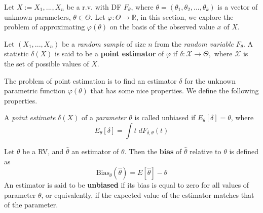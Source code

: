 \documentclass{tufte-handout}
\begin{document}
\hspace{24pt}Let $X := X_1, ...,X_n$ be a r.v. with DF $F_\theta$, where $\theta = (\theta_1, \theta_2 , . . . , \theta_k)$ is a vector of unknown parameters, $\theta \in \Theta$. Let $\varphi: \Theta \to \mathbb{R}$,  in this section, we explore the problem of approximating $\varphi(\theta)$ on the basis of the observed value $x$ of $X.$ 
\begin{definition}
  Let $(X_1,...,X_n)$ be a \textit{random sample} of size $n$ from the \textit{random variable} $F_\theta $. A statistic $\delta(X)$ is said to be a \textbf{point estimator} of $\varphi$ if $\delta: \mathcal{X}\to \Theta,$ where $\mathcal{X}$ is the set of possible values of $X.$ 
\end{definition}
\hspace{24pt}The problem of point estimation is to find an estimator $\delta$ for the unknown parametric function $\varphi(\theta)$ that has some nice properties. We define the following properties.

\begin{definition}[Unbiasedness]
  A \textit{point estimate} $\delta(X)$ of a \textit{parameter} $\theta$ is called unbiased if $E_\theta[\delta] = \theta$, where 
  $$E_\theta [\delta] = \int t \; dF_{\delta, \theta}(t) $$
\end{definition}

\begin{definition}[Bias]
Let $\theta$ be a RV, and $\hat \theta$ an estimator of $\theta$. Then the \textbf{bias} of $\hat \theta$ relative to $\theta$ is defined as 
  $$\text{Bias}_\theta (\hat \theta) = E[\hat \theta] -\theta  $$
  An estimator is said to be \textbf{unbiased} if its bias is equal to zero for all values of parameter $\theta$, or equivalently, if the expected value of the estimator matches that of the parameter.
\end{definition}
\end{document}

